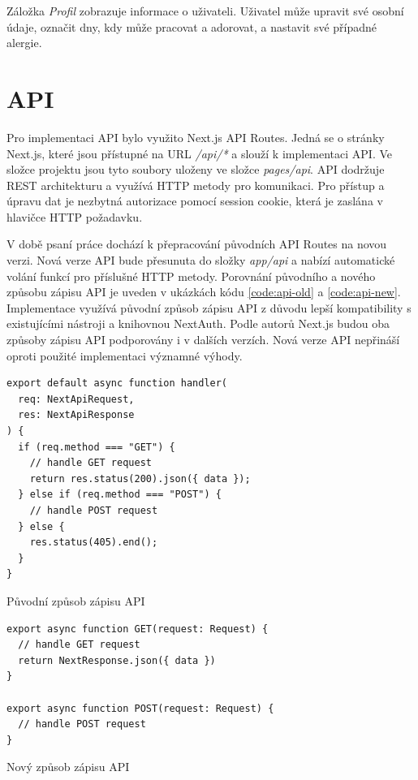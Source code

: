Záložka \textit{Profil} zobrazuje informace o uživateli. Uživatel může upravit své osobní údaje, označit dny, kdy může pracovat a adorovat,
a nastavit své případné alergie.

\section{API}

Pro implementaci API bylo využito Next.js API Routes. Jedná se o stránky Next.js, které jsou přístupné na URL \textit{/api/*} a slouží k implementaci API.
Ve složce projektu jsou tyto soubory uloženy ve složce \textit{pages/api}.
API dodržuje REST architekturu a využívá HTTP metody pro komunikaci. Pro přístup a úpravu dat je nezbytná autorizace pomocí session cookie, která je zaslána v hlavičce HTTP požadavku.

V době psaní práce dochází k přepracování původních API Routes na novou verzi. Nová verze API bude přesunuta do složky \textit{app/api} a nabízí automatické volání
funkcí pro příslušné HTTP metody. Porovnání původního a nového způsobu zápisu API je uveden v ukázkách kódu \ref{code:api-old} a \ref{code:api-new}.
Implementace využívá původní způsob zápisu API z důvodu lepší kompatibility s existujícími nástroji a knihovnou NextAuth. Podle autorů Next.js budou oba způsoby zápisu API
podporovány i v dalších verzích. Nová verze API nepřináší oproti použité implementaci významné výhody.

\begin{listing}[h]
  \begin{verbatim}
export default async function handler(
  req: NextApiRequest,
  res: NextApiResponse
) {
  if (req.method === "GET") {
    // handle GET request
    return res.status(200).json({ data });
  } else if (req.method === "POST") {
    // handle POST request
  } else {
    res.status(405).end();
  }
}
  \end{verbatim}
  \caption{Původní způsob zápisu API}
  \label{code:api-old}
\end{listing}

\begin{listing}[h]
\begin{verbatim}
export async function GET(request: Request) {
  // handle GET request
  return NextResponse.json({ data })
}

export async function POST(request: Request) {
  // handle POST request
}
  \end{verbatim}
  \caption{Nový způsob zápisu API}
  \label{code:api-new}
\end{listing}

